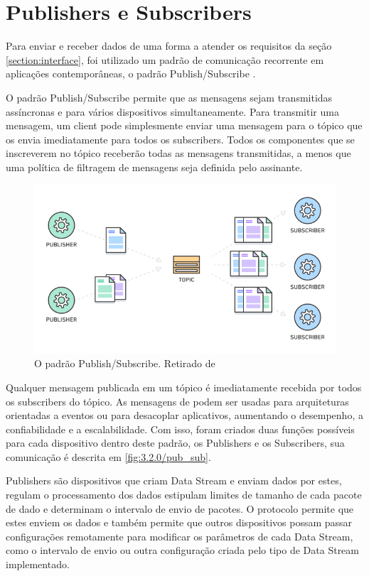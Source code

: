 \section{Publishers e Subscribers}
\label{section:publishers_subscribers}

Para enviar e receber dados de uma forma a atender os requisitos da seção \ref{section:interface}, foi utilizado um padrão de comunicação recorrente em aplicações contemporâneas, o padrão Publish/Subscribe \cite{amazon:pub-sub}.

O padrão Publish/Subscribe permite que as mensagens sejam transmitidas assíncronas e para vários dispositivos simultaneamente. Para transmitir uma mensagem, um client pode simplesmente enviar uma mensagem para o tópico que os envia imediatamente para todos os subscribers. Todos os componentes que se inscreverem no tópico receberão todas as mensagens transmitidas, a menos que uma política de filtragem de mensagens seja definida pelo assinante.

\begin{figure}[h!]
\centering
\includegraphics[width=12cm]{./02_Capitulos/02_Cap3/figures/aws_pub_sub}
\caption{O padrão Publish/Subscribe. Retirado de \cite{amazon:pub_sub}}
\label{fig:3.2.0/aws_pub_sub}
\end{figure}

Qualquer mensagem publicada em um tópico é imediatamente recebida por todos os subscribers do tópico. As mensagens de podem ser usadas para arquiteturas orientadas a eventos ou para desacoplar aplicativos, aumentando  o desempenho, a confiabilidade e a escalabilidade. Com isso, foram criados duas funções possíveis para cada dispositivo dentro deste padrão, os Publishers e os Subscribers, sua comunicação é descrita em \ref{fig:3.2.0/pub_sub}.




Publishers são dispositivos que criam Data Stream  e enviam dados por estes, regulam o processamento dos dados estipulam limites de tamanho de cada pacote de dado e determinam o intervalo de envio de pacotes. O protocolo permite que estes enviem os dados e também permite que outros dispositivos possam passar configurações remotamente para modificar os parâmetros de cada Data Stream, como o intervalo de envio ou outra configuração criada pelo tipo de Data Stream implementado. 


